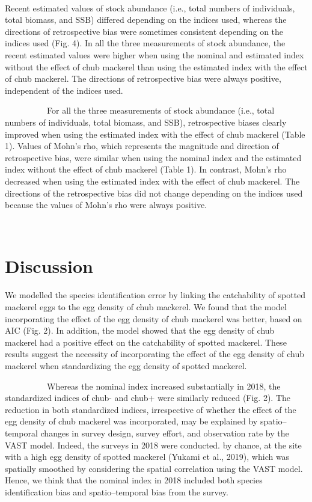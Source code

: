 \documentclass[12pt]{article}
\begin{document}
\begin{linenumbers}
\\
Recent estimated values of stock abundance (i.e., total numbers of individuals, total biomass, and SSB) differed depending on the indices used, whereas the directions of retrospective bias were sometimes consistent depending on the indices used (Fig. 4). In all the three measurements of stock abundance, the recent estimated values were higher when using the nominal and estimated index without the effect of chub mackerel than using the estimated index with the effect of chub mackerel. The directions of retrospective bias were always positive, independent of the indices used.

\ \ \ \ \ \ \ \ \ \
For all the three measurements of stock abundance (i.e., total numbers of individuals, total biomass, and SSB), retrospective biases clearly improved when using the estimated index with the effect of chub mackerel (Table 1). Values of Mohn's rho, which represents the magnitude and direction of retrospective bias, were similar when using the nominal index and the estimated index without the effect of chub mackerel (Table 1). In contrast, Mohn's rho decreased when using the estimated index with the effect of chub mackerel. The directions of the retrospective bias did not change depending on the indices used because the values of Mohn's rho were always positive.


\ \\
\section{Discussion}
We modelled the species identification error by linking the catchability of spotted mackerel eggs to the egg density of chub mackerel. We found that the model incorporating the effect of the egg density of chub mackerel was better, based on AIC (Fig. 2). In addition, the model showed that the egg density of chub mackerel had a positive effect on the catchability of spotted mackerel. These results suggest the necessity of incorporating the effect of the egg density of chub mackerel when standardizing the egg density of spotted mackerel.

\ \ \ \ \ \ \ \ \ \
Whereas the nominal index increased substantially in 2018, the standardized indices of chub- and chub+ were similarly reduced (Fig. 2). The reduction in both standardized indices, irrespective of whether the effect of the egg density of chub mackerel was incorporated, may be explained by spatio--temporal changes in survey design, survey effort, and observation rate by the VAST model. Indeed, the surveys in 2018 were conducted. by chance, at the site with a high egg density of spotted mackerel (Yukami et al., 2019), which was spatially smoothed by considering the spatial correlation using the VAST model. Hence, we think that the nominal index in 2018 included both species identification bias and spatio--temporal bias from the survey.


\end{linenumbers}
\end{document}
